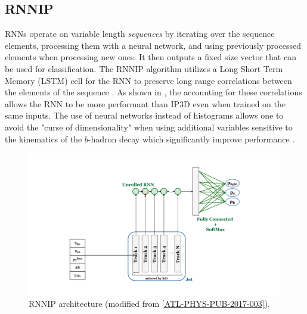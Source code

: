 \subsection{RNNIP}

\def\figpath{figures/ftag/dips-note/}



RNNs operate on variable length \emph{sequences} by iterating over the sequence elements, processing them with a neural network, and using previously processed elements when processing new ones. 
It then outputs a fixed size vector that can be used for classification. 
The RNNIP algorithm utilizes a Long Short Term Memory (LSTM) cell for the RNN to preserve long range correlations between the elements of the sequence \cite{LSTMs}. 
As shown in \cite{ATL-PHYS-PUB-2017-003}, the accounting for these correlations allows the RNN to be more performant than IP3D even when trained on the same inputs.
The use of neural networks instead of histograms allows one to avoid the "curse of dimensionality" when using additional variables sensitive to the kinematics of the $b$-hadron decay which significantly improve performance \cite{ATL-PHYS-PUB-2017-003}.


\begin{figure}[htbp]
\centering
\includegraphics[width=0.8\linewidth]{figures/ftag/RNN-graphic}
\caption{RNNIP architecture (modified from \ref{ATL-PHYS-PUB-2017-003}).}
 \label{fig:RNN-graphic}
\end{figure}


